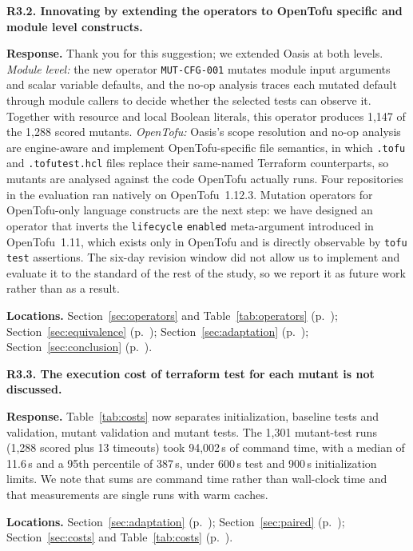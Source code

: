 \medskip
\noindent\textbf{R3.2. Innovating by extending the operators to OpenTofu specific and module level constructs.}\par
\textbf{Response.} Thank you for this suggestion; we extended Oasis at both levels. \emph{Module level:} the new operator \texttt{MUT-CFG-001} mutates module input arguments and scalar variable defaults, and the no-op analysis traces each mutated default through module callers to decide whether the selected tests can observe it. Together with resource and local Boolean literals, this operator produces 1,147 of the 1,288 scored mutants. \emph{OpenTofu:} Oasis's scope resolution and no-op analysis are engine-aware and implement OpenTofu-specific file semantics, in which \texttt{.tofu} and \texttt{.tofutest.hcl} files replace their same-named Terraform counterparts, so mutants are analysed against the code OpenTofu actually runs. Four repositories in the evaluation ran natively on OpenTofu~1.12.3. Mutation operators for OpenTofu-only language constructs are the next step: we have designed an operator that inverts the \texttt{lifecycle} \texttt{enabled} meta-argument introduced in OpenTofu~1.11, which exists only in OpenTofu and is directly observable by \texttt{tofu test} assertions. The six-day revision window did not allow us to implement and evaluate it to the standard of the rest of the study, so we report it as future work rather than as a result.\par
\textbf{Locations.} Section~\ref{sec:operators} and Table~\ref{tab:operators} (p.~\pageref{tab:operators}); Section~\ref{sec:equivalence} (p.~\pageref{sec:equivalence}); Section~\ref{sec:adaptation} (p.~\pageref{sec:adaptation}); Section~\ref{sec:conclusion} (p.~\pageref{sec:conclusion}).

\medskip
\noindent\textbf{R3.3. The execution cost of terraform test for each mutant is not discussed.}\par
\textbf{Response.} Table~\ref{tab:costs} now separates initialization, baseline tests and validation, mutant validation and mutant tests. The 1,301 mutant-test runs (1,288 scored plus 13 timeouts) took 94,002\,s of command time, with a median of 11.6\,s and a 95th percentile of 387\,s, under 600\,s test and 900\,s initialization limits. We note that sums are command time rather than wall-clock time and that measurements are single runs with warm caches.\par
\textbf{Locations.} Section~\ref{sec:adaptation} (p.~\pageref{sec:adaptation}); Section~\ref{sec:paired} (p.~\pageref{sec:paired}); Section~\ref{sec:costs} and Table~\ref{tab:costs} (p.~\pageref{tab:costs}).


